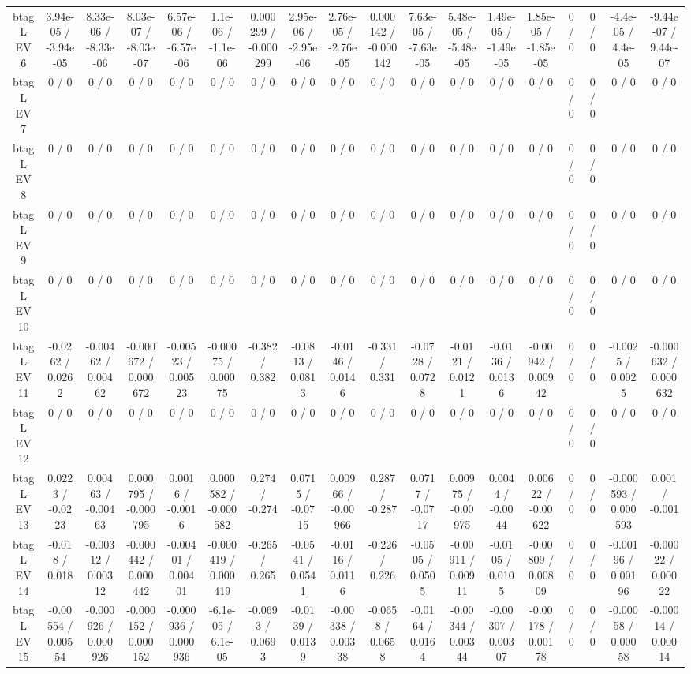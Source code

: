 \documentclass[10pt]{article}
\begin{document}
\begin{table}[htbp]
\begin{center}
\begin{tabular}{|c|c|c|c|c|c|c|c|c|c|c|c|c|c|c|c|c|c|}
  btag L EV 6 & 3.94e-05 / -3.94e-05 & 8.33e-06 / -8.33e-06 & 8.03e-07 / -8.03e-07 & 6.57e-06 / -6.57e-06 & 1.1e-06 / -1.1e-06 & 0.000299 / -0.000299 & 2.95e-06 / -2.95e-06 & 2.76e-05 / -2.76e-05 & 0.000142 / -0.000142 & 7.63e-05 / -7.63e-05 & 5.48e-05 / -5.48e-05 & 1.49e-05 / -1.49e-05 & 1.85e-05 / -1.85e-05 & 0 / 0 & 0 / 0 & -4.4e-05 / 4.4e-05 & -9.44e-07 / 9.44e-07 \\ 
  btag L EV 7 & 0 / 0 & 0 / 0 & 0 / 0 & 0 / 0 & 0 / 0 & 0 / 0 & 0 / 0 & 0 / 0 & 0 / 0 & 0 / 0 & 0 / 0 & 0 / 0 & 0 / 0 & 0 / 0 & 0 / 0 & 0 / 0 & 0 / 0 \\ 
  btag L EV 8 & 0 / 0 & 0 / 0 & 0 / 0 & 0 / 0 & 0 / 0 & 0 / 0 & 0 / 0 & 0 / 0 & 0 / 0 & 0 / 0 & 0 / 0 & 0 / 0 & 0 / 0 & 0 / 0 & 0 / 0 & 0 / 0 & 0 / 0 \\ 
  btag L EV 9 & 0 / 0 & 0 / 0 & 0 / 0 & 0 / 0 & 0 / 0 & 0 / 0 & 0 / 0 & 0 / 0 & 0 / 0 & 0 / 0 & 0 / 0 & 0 / 0 & 0 / 0 & 0 / 0 & 0 / 0 & 0 / 0 & 0 / 0 \\ 
  btag L EV 10 & 0 / 0 & 0 / 0 & 0 / 0 & 0 / 0 & 0 / 0 & 0 / 0 & 0 / 0 & 0 / 0 & 0 / 0 & 0 / 0 & 0 / 0 & 0 / 0 & 0 / 0 & 0 / 0 & 0 / 0 & 0 / 0 & 0 / 0 \\ 
  btag L EV 11 & -0.0262 / 0.0262 & -0.00462 / 0.00462 & -0.000672 / 0.000672 & -0.00523 / 0.00523 & -0.00075 / 0.00075 & -0.382 / 0.382 & -0.0813 / 0.0813 & -0.0146 / 0.0146 & -0.331 / 0.331 & -0.0728 / 0.0728 & -0.0121 / 0.0121 & -0.0136 / 0.0136 & -0.00942 / 0.00942 & 0 / 0 & 0 / 0 & -0.0025 / 0.0025 & -0.000632 / 0.000632 \\ 
  btag L EV 12 & 0 / 0 & 0 / 0 & 0 / 0 & 0 / 0 & 0 / 0 & 0 / 0 & 0 / 0 & 0 / 0 & 0 / 0 & 0 / 0 & 0 / 0 & 0 / 0 & 0 / 0 & 0 / 0 & 0 / 0 & 0 / 0 & 0 / 0 \\ 
  btag L EV 13 & 0.0223 / -0.0223 & 0.00463 / -0.00463 & 0.000795 / -0.000795 & 0.0016 / -0.0016 & 0.000582 / -0.000582 & 0.274 / -0.274 & 0.0715 / -0.0715 & 0.00966 / -0.00966 & 0.287 / -0.287 & 0.0717 / -0.0717 & 0.00975 / -0.00975 & 0.0044 / -0.0044 & 0.00622 / -0.00622 & 0 / 0 & 0 / 0 & -0.000593 / 0.000593 & 0.001 / -0.001 \\ 
  btag L EV 14 & -0.018 / 0.018 & -0.00312 / 0.00312 & -0.000442 / 0.000442 & -0.00401 / 0.00401 & -0.000419 / 0.000419 & -0.265 / 0.265 & -0.0541 / 0.0541 & -0.0116 / 0.0116 & -0.226 / 0.226 & -0.0505 / 0.0505 & -0.00911 / 0.00911 & -0.0105 / 0.0105 & -0.00809 / 0.00809 & 0 / 0 & 0 / 0 & -0.00196 / 0.00196 & -0.00022 / 0.00022 \\ 
  btag L EV 15 & -0.00554 / 0.00554 & -0.000926 / 0.000926 & -0.000152 / 0.000152 & -0.000936 / 0.000936 & -6.1e-05 / 6.1e-05 & -0.0693 / 0.0693 & -0.0139 / 0.0139 & -0.00338 / 0.00338 & -0.0658 / 0.0658 & -0.0164 / 0.0164 & -0.00344 / 0.00344 & -0.00307 / 0.00307 & -0.00178 / 0.00178 & 0 / 0 & 0 / 0 & -0.00058 / 0.00058 & -0.00014 / 0.00014 \\ 

\end{tabular}
\end{center}
\end{table}
\end{document}
